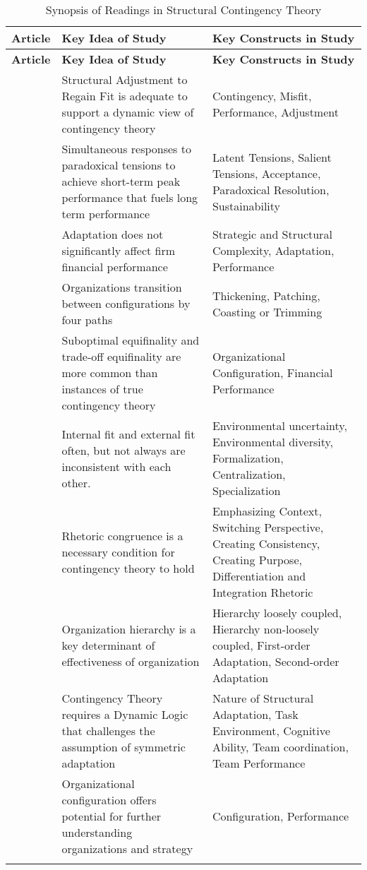 \documentclass[12pt]{article}
\begin{document}
\begin{center}
\begin{longtable}{|p{}|p{}|p{}|}
\label{table:themes}\\
\hline \textbf{Article}&\textbf{Key Idea of Study}&\textbf{Key Constructs in Study}\\\hline
\endfirsthead
\hline \textbf{Article}&\textbf{Key Idea of Study}&\textbf{Key Constructs in Study}\\\hline
\endhead

\cite{Donaldson1987}&Structural Adjustment to Regain Fit is adequate to support a dynamic view of contingency theory&Contingency, Misfit, Performance, Adjustment\\\hline
\cite{Smith2011}&Simultaneous responses to paradoxical tensions to achieve short-term peak performance that fuels long term performance&Latent Tensions, Salient Tensions, Acceptance, Paradoxical Resolution, Sustainability\\\hline
\cite{Menz2014}&Adaptation does not significantly affect firm financial performance&Strategic and Structural Complexity, Adaptation, Performance\\\hline
\cite{Siggelkow2002}&Organizations transition between configurations by four paths&Thickening, Patching, Coasting or Trimming\\\hline
\cite{Payne2006}&Suboptimal equifinality and trade-off equifinality are more common than instances of true contingency theory&Organizational Configuration, Financial Performance\\\hline
\cite{Miller1992}&Internal fit and external fit often, but not always are inconsistent with each other. &Environmental uncertainty, Environmental diversity, Formalization, Centralization, Specialization\\\hline
\cite{Sillince2005}&Rhetoric congruence is a necessary condition for contingency theory to hold&Emphasizing Context, Switching Perspective, Creating Consistency, Creating Purpose, Differentiation and Integration Rhetoric\\\hline
\cite{Ethiraj2004}&Organization hierarchy is a key determinant of effectiveness of organization&Hierarchy loosely coupled, Hierarchy non-loosely coupled, First-order Adaptation, Second-order Adaptation\\\hline
\cite{Moon2004}&Contingency Theory requires a Dynamic Logic that challenges the assumption of symmetric adaptation&Nature of Structural Adaptation, Task Environment, Cognitive Ability, Team coordination, Team Performance\\\hline
\cite{Short2008}&Organizational configuration offers potential for further understanding organizations and strategy&Configuration, Performance\\\hline
\caption {Synopsis of Readings in Structural Contingency Theory}
\end{longtable}
\end{center}
\end{document}
